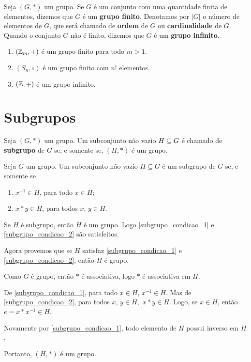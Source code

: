 \begin{definicao}
    Seja $(G,*)$ um grupo. Se $G$ é um conjunto com uma quantidade finita de elementos, dizemos que $G$ é um \textbf{grupo finito}. Denotamos por $|G|$ o número de elementos de $G$, que será chamado de \textbf{ordem} de $G$ ou \textbf{cardinalidade} de $G$. Quando o conjunto $G$ não é finito, dizemos que $G$ é um \textbf{grupo infinito}.
\end{definicao}

\begin{exemplos}
    \begin{enumerate}[label={\arabic*})]
        \item $(\mathbb{Z}_m, +)$ é um grupo finito para todo $m>1$.
        \item $(S_n, \circ)$ é um grupo finito com $n!$ elementos.
        \item $(\mathbb{Z}, +)$ é um grupo infinito.
    \end{enumerate}
\end{exemplos}

\section{Subgrupos} %
\label{sec:subgrupos}

\begin{definicao}
    Seja $(G,*)$ um grupo. Um subconjunto não vazio $H\subseteq G$ é chamado de \textbf{subgrupo} de $G$ se, e somente se, $(H,*)$ é um grupo.
\end{definicao}

\begin{proposicao}
    Seja $G$ um grupo. Um subconjunto não vazio $H\subseteq G$ é um subgrupo de $G$ se, e somente se
    \begin{enumerate}[label={\roman*})]
        \item\label{subgrupo_condicao_1} $x^{-1}\in H$, para todo $x \in H$;
        \item\label{subgrupo_condicao_2} $x*y\in H$, para todos $x$, $y \in H$.
    \end{enumerate}
\end{proposicao}
\begin{prova}
    Se $H$ é subgrupo, então $H$ é um grupo. Logo \ref{subgrupo_condicao_1} e \ref{subgrupo_condicao_2} são satisfeitos.

    Agora provemos que se $H$ satisfaz \ref{subgrupo_condicao_1} e \ref{subgrupo_condicao_2}, então $H$ é grupo.

    Como $G$ é grupo, então $*$ é associativa, logo $*$ é associativa em $H$.

    De \ref{subgrupo_condicao_1}, para todo $x \in H$, $x^{-1}\in H$. Mas de \ref{subgrupo_condicao_2}, para todos $x$, $y \in H,$ $x*y \in H$. Logo, se $x\in H$, então $e = x*x^{-1} \in H$.

    Novamente por \ref{subgrupo_condicao_1}, todo elemento de $H$ possui inverso em $H$.

    Portanto, $(H,*)$ é um grupo.
\end{prova}


